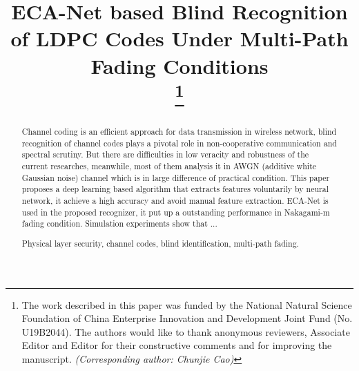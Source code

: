 \documentclass[conference]{IEEEtran}
\begin{document}
\title{ECA-Net based Blind Recognition of LDPC Codes Under Multi-Path Fading Conditions\\

\thanks{The work described in this paper was funded by the National Natural Science Foundation of China Enterprise Innovation and Development Joint Fund (No. U19B2044). The authors would like to thank anonymous reviewers, Associate Editor and Editor for their constructive comments and for improving the manuscript. \textit{(Corresponding author: Chunjie Cao)}}
}

\author{
}

\maketitle

\begin{abstract}
Channel coding is an efficient approach for data transmission in wireless network, blind recognition of channel codes plays a pivotal role in non-cooperative communication and spectral scrutiny. But there are difficulties in low veracity and robustness of the current researches, meanwhile, most of them analysis it in AWGN (additive white Gaussian noise) channel which is in large difference of practical condition. This paper proposes a deep learning based algorithm that extracts features voluntarily by neural network, it achieve a high accuracy and avoid manual feature extraction. ECA-Net is used in the proposed recognizer, it put up a outstanding performance in Nakagami-m fading condition. Simulation experiments show that ...


\begin{IEEEkeywords}
	Physical layer security, channel codes, blind identification, multi-path fading.
\end{IEEEkeywords}

\end{abstract}
\end{document}
